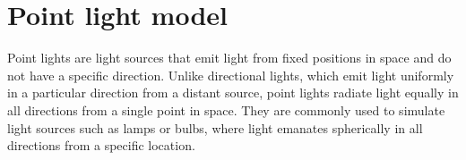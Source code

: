 \section{Point light model}

Point lights are light sources that emit light from fixed positions in space and do not have a specific direction. 
Unlike directional lights, which emit light uniformly in a particular direction from a distant source, point lights radiate light equally in all directions from a single point in space. 
They are commonly used to simulate light sources such as lamps or bulbs, where light emanates spherically in all directions from a specific location.